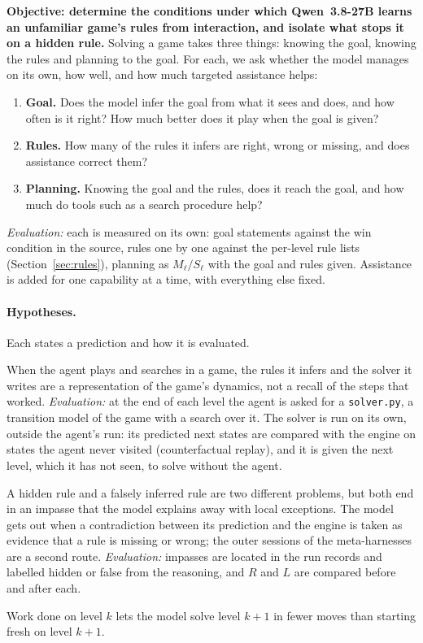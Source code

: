 \documentclass[11pt,a4paper]{article}
\newcommand{\qsmall}{Qwen~3.8-27B}
\begin{document}
\textbf{Objective: determine the conditions under which \qsmall{} learns an
unfamiliar game's rules from interaction, and isolate what stops it on a hidden rule.} Solving a game takes three things: knowing the goal, knowing
the rules and planning to the goal. For each, we ask whether the model
manages on its own, how well, and how much targeted assistance helps:
\begin{enumerate}[leftmargin=1.5em]
  \item \textbf{Goal.} Does the model infer the goal from what it sees and
  does, and how often is it right? How much better does it play when the
  goal is given?
  \item \textbf{Rules.} How many of the rules it infers are right, wrong or
  missing, and does assistance correct them?
  \item \textbf{Planning.} Knowing the goal and the rules, does it reach the
  goal, and how much do tools such as a search procedure help?
\end{enumerate}
\emph{Evaluation:} each is measured on its own: goal statements against the
win condition in the source, rules one by one against the per-level rule
lists (Section~\ref{sec:rules}), planning as $M_\ell/S_\ell$ with the goal
and rules given. Assistance is added for one capability at a time, with
everything else fixed.

\paragraph{Hypotheses.} Each states a prediction and how it is evaluated.
\begin{description}[leftmargin=1.2em]
  \item[H1: The agent learns the domain, not a path.] When the agent plays
  and searches in a game, the rules it infers and the solver it writes are a
  representation of the game's dynamics, not a recall of the steps that
  worked. \emph{Evaluation:} at the end of each level the agent is asked for
  a \texttt{solver.py}, a transition model of the game with a search over it.
  The solver is run on its own, outside the agent's run: its predicted next
  states are compared with the engine on states the agent never visited
  (counterfactual replay), and it is given the next level, which it has not
  seen, to solve without the agent.
  \item[H2: An impasse needs a rule-level explanation.] A hidden rule and a
  falsely inferred rule are two different problems, but both end in an
  impasse that the model explains away with local exceptions. The model gets
  out when a contradiction between its prediction and the engine is taken
  as evidence that a rule is missing or wrong; the outer sessions of the
  meta-harnesses are a second route. \emph{Evaluation:} impasses are located
  in the run records and labelled hidden or false from the reasoning, and
  $R$ and $L$ are compared before and after each.
  \item[H3: Learning carries over.] Work done on level $k$ lets the model
  solve level $k{+}1$ in fewer moves than starting fresh on level $k{+}1$.
\end{description}
\end{document}
